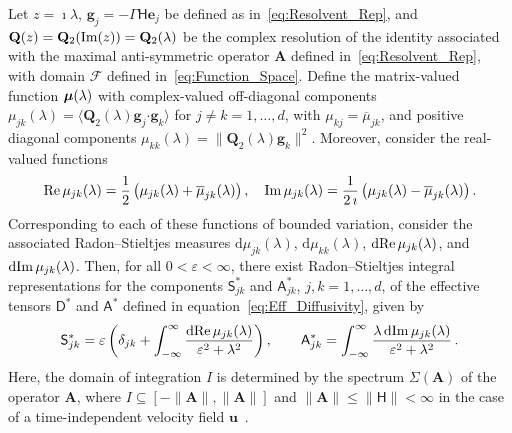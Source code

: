 \documentclass[leqno,onefignum,onetabnum]{siamltex1213}
\renewcommand{\d}{\mathrm{d}}
\newcommand{\Ab}{\mathbf{A}}
\newcommand{\Qb}{\mathbf{Q}}
\newcommand{\Fc}{\mathcal{F}}
\newcommand{\Dm}{\mathsf{D}}
\newcommand{\Hm}{\mathsf{H}}
\newcommand{\Sm}{\mathsf{S}}
\newcommand{\Am}{\mathsf{A}}
\newcommand\bmu{\mbox{\boldmath${\mu}$}}
\providecommand\bcdot{\boldsymbol{\cdot}}
\newcommand{\vecg}{\boldsymbol{g}}
\newcommand{\vecu}{\boldsymbol{u}}
\newcommand{\vece}{\boldsymbol{e}}
\begin{document}
\begin{theorem}\label{thm:Integral_Reps}
%
Let $z=\imath\lambda$, $\vecg_j=-\Gamma\Hm\vece _j$ be defined as
in~\eqref{eq:Resolvent_Rep}, and $\Qb(z)=\Qb_2({\rm Im}(z))=\Qb_2(\lambda)$
be  
the complex resolution of the identity associated with the maximal
anti-symmetric operator $\Ab$ defined in~\eqref{eq:Resolvent_Rep}, with
domain $\Fc$ defined in~\eqref{eq:Function_Space}. Define the
matrix-valued function $\bmu(\lambda)$ with complex-valued off-diagonal
components $\mu_{jk}(\lambda)=\langle\Qb_2(\lambda)\vecg_j\bcdot\vecg_k\rangle$ for $j\neq k=1,\ldots,d$,
with $\mu_{kj}=\overline{\mu}_{jk}$, and positive diagonal components
$\mu_{kk}(\lambda)=\|\Qb_2(\lambda)\vecg_k\|^2$.  Moreover, consider the real-valued
functions   
%
\begin{align}%
  {\rm Re}\,\mu_{jk}(\lambda)
         =\frac{1}{2}\left(\mu_{jk}(\lambda)+\overline{\mu}_{jk}(\lambda)\right), \quad
  {\rm Im}\,\mu_{jk}(\lambda)
         =\frac{1}{2\,\imath}\left(\mu_{jk}(\lambda)-\overline{\mu}_{jk}(\lambda)\right).
\end{align}
%
Corresponding to each of these functions of bounded variation, 
consider the associated 
Radon--Stieltjes measures $\d\mu_{jk}(\lambda)$, $\d\mu_{kk}(\lambda)$, $\d{\rm
  Re}\,\mu_{jk}(\lambda)$, and $\d{\rm Im}\,\mu_{jk}(\lambda)$. Then, for all $0<\varepsilon<\infty$,
there exist Radon--Stieltjes integral representations for the
components $\Sm^*_{jk}$ and $\Am^*_{jk}$, $j,k=1,\ldots,d$, of the effective
tensors $\Dm^*$ and $\Am^*$ defined in
equation~\eqref{eq:Eff_Diffusivity}, given by           
%
\begin{align}\label{eq:Integral_Rep_kappa*}
  \Sm^*_{jk}=\varepsilon\left(\delta_{jk}+\int_{-\infty}^\infty\frac{\d{\rm Re}\,\mu_{jk}(\lambda)}{\varepsilon^2+\lambda^2}\right),
  \qquad
  \Am^*_{jk}=\int_{-\infty}^\infty\frac{\lambda\,\d{\rm Im}\,\mu_{jk}(\lambda)}{\varepsilon^2+\lambda^2}\,.       
\end{align}
%
Here, the domain of integration $I$ is determined by the spectrum
$\Sigma(\Ab)$ of the operator $\Ab$, where $I\subseteq[-\|\Ab\|,\|\Ab\|]$ and
$\|\Ab\|\leq\|\Hm\|<\infty$ in the case of a time-independent velocity field
$\vecu $~\cite{Reed-1980}.     
%
\end{theorem}
\end{document}
